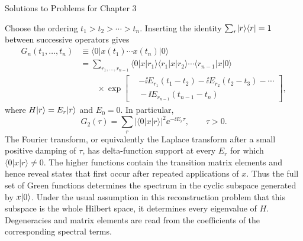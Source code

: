 \begin{bankssolutions}{Solutions to Problems for Chapter 3}

Choose the ordering $t_1>t_2>\cdots>t_n$.  Inserting the identity
$\sum_r\lvert r\rangle\langle r\rvert=1$ between successive operators gives
\begin{align*}
 G_n(t_1,\ldots,t_n)
 &\equiv \langle0|x(t_1)\cdots x(t_n)|0\rangle \\
 &=\sum_{r_1,\ldots,r_{n-1}}
 \langle0|x|r_1\rangle\langle r_1|x|r_2\rangle\cdots
 \langle r_{n-1}|x|0\rangle\\[-2pt]
 &\qquad\times
 \exp\!\left[\begin{aligned}
 &-\ii E_{r_1}(t_1-t_2)-\ii E_{r_2}(t_2-t_3)-\cdots\\[-2pt]
 &{}-\ii E_{r_{n-1}}(t_{n-1}-t_n)
 \end{aligned}\right],
\end{align*}
where $H\lvert r\rangle=E_r\lvert r\rangle$ and $E_0=0$.  In particular,
\begin{equation*}
 G_2(\tau)=\sum_r |\langle0|x|r\rangle|^2\ee^{-\ii E_r\tau},
 \qquad \tau>0.
\end{equation*}
The Fourier transform, or equivalently the Laplace transform after a small
positive damping of $\tau$, has delta-function support at every $E_r$ for
which $\langle0|x|r\rangle\ne0$.  The higher functions contain the transition
matrix elements and hence reveal states that first occur after repeated
applications of $x$.  Thus the full set of Green functions determines the
spectrum in the cyclic subspace generated by $x\lvert 0\rangle$.  Under the usual
assumption in this reconstruction problem that this subspace is the whole
Hilbert space, it determines every eigenvalue of $H$.  Degeneracies and matrix
elements are read from the coefficients of the corresponding spectral terms.


\end{bankssolutions}
